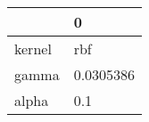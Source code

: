 \begin{tabular}{ll}
\toprule
{} &          0 \\
\midrule
kernel &        rbf \\
gamma  &  0.0305386 \\
alpha  &        0.1 \\
\bottomrule
\end{tabular}
